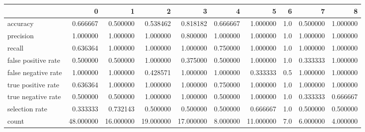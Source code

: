 \begin{tabular}{lrrrrrrrrr}
\toprule
{} &          0 &          1 &          2 &          3 &         4 &          5 &    6 &         7 &         8 \\
\midrule
accuracy            &   0.666667 &   0.500000 &   0.538462 &   0.818182 &  0.666667 &   1.000000 &  1.0 &  0.500000 &  1.000000 \\
precision           &   1.000000 &   1.000000 &   1.000000 &   0.800000 &  1.000000 &   1.000000 &  1.0 &  1.000000 &  1.000000 \\
recall              &   0.636364 &   1.000000 &   1.000000 &   1.000000 &  0.750000 &   1.000000 &  1.0 &  1.000000 &  1.000000 \\
false positive rate &   0.500000 &   0.500000 &   1.000000 &   0.375000 &  0.500000 &   1.000000 &  1.0 &  0.333333 &  1.000000 \\
false negative rate &   1.000000 &   1.000000 &   0.428571 &   1.000000 &  1.000000 &   0.333333 &  0.5 &  1.000000 &  1.000000 \\
true positive rate  &   0.636364 &   1.000000 &   1.000000 &   1.000000 &  0.750000 &   1.000000 &  1.0 &  1.000000 &  1.000000 \\
true negative rate  &   0.500000 &   0.500000 &   1.000000 &   1.000000 &  0.500000 &   1.000000 &  1.0 &  0.333333 &  0.666667 \\
selection rate      &   0.333333 &   0.732143 &   0.500000 &   0.500000 &  0.500000 &   0.666667 &  1.0 &  0.500000 &  0.500000 \\
count               &  48.000000 &  16.000000 &  19.000000 &  17.000000 &  8.000000 &  11.000000 &  7.0 &  6.000000 &  4.000000 \\
\bottomrule
\end{tabular}

